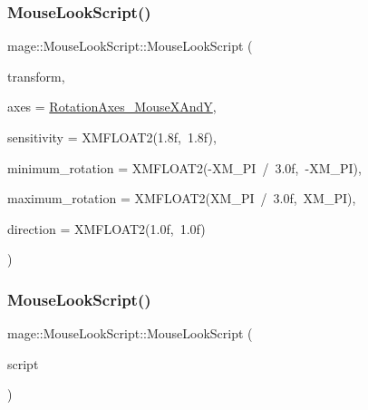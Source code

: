 \subsubsection{\texorpdfstring{Mouse\+Look\+Script()}{MouseLookScript()}\hspace{0.1cm}{\footnotesize\ttfamily [1/3]}}
{\footnotesize\ttfamily mage\+::\+Mouse\+Look\+Script\+::\+Mouse\+Look\+Script (\begin{DoxyParamCaption}\item[{\hyperlink{classmage_1_1_transform_node}{Transform\+Node} $\ast$}]{transform,  }\item[{\hyperlink{namespacemage_a548e5c31b08a1078841ed21948f5bf4c}{Rotation\+Axes}}]{axes = {\ttfamily \hyperlink{namespacemage_a548e5c31b08a1078841ed21948f5bf4ca6b0dd5cb81f83efb4c2b36456d84750d}{Rotation\+Axes\+\_\+\+Mouse\+X\+AndY}},  }\item[{const X\+M\+F\+L\+O\+A\+T2 \&}]{sensitivity = {\ttfamily XMFLOAT2(1.8f,~1.8f)},  }\item[{const X\+M\+F\+L\+O\+A\+T2 \&}]{minimum\+\_\+rotation = {\ttfamily XMFLOAT2(-\/XM\+\_\+PI~/~3.0f,~-\/XM\+\_\+PI)},  }\item[{const X\+M\+F\+L\+O\+A\+T2 \&}]{maximum\+\_\+rotation = {\ttfamily XMFLOAT2(XM\+\_\+PI~/~3.0f,~XM\+\_\+PI)},  }\item[{const X\+M\+F\+L\+O\+A\+T2 \&}]{direction = {\ttfamily XMFLOAT2(1.0f,~1.0f)} }\end{DoxyParamCaption})\hspace{0.3cm}{\ttfamily [explicit]}}

\hypertarget{classmage_1_1_mouse_look_script_a54bd09419068ab61c4dd6fda412771d3}{}\label{classmage_1_1_mouse_look_script_a54bd09419068ab61c4dd6fda412771d3} 
\subsubsection{\texorpdfstring{Mouse\+Look\+Script()}{MouseLookScript()}\hspace{0.1cm}{\footnotesize\ttfamily [2/3]}}
{\footnotesize\ttfamily mage\+::\+Mouse\+Look\+Script\+::\+Mouse\+Look\+Script (\begin{DoxyParamCaption}\item[{const \hyperlink{classmage_1_1_mouse_look_script}{Mouse\+Look\+Script} \&}]{script }\end{DoxyParamCaption})\hspace{0.3cm}{\ttfamily [delete]}}

